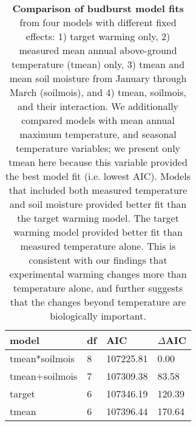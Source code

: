 \documentclass{article}
\begin{document}
\begin{table}[ht]
\centering
\caption{\textbf{Comparison of budburst model fits} from four models with different fixed effects: 1) target warming only, 2) measured mean annual above-ground temperature (tmean) only, 3) tmean and mean soil moisture from January through March (soilmois), and 4) tmean, soilmois, and their interaction. We additionally compared models with mean annual maximum temperature, and seasonal temperature variables; we present only tmean here because this variable provided the best model fit (i.e. lowest AIC). Models that included both measured temperature and soil moisture provided better fit than the target warming model. The target warming model provided better fit than measured temperature alone. This is consistent with our findings that experimental warming changes more than temperature alone, and further suggests that the changes beyond temperature are biologically important.} 
\label{table:bbaic}
\begingroup\footnotesize
\begin{tabular}{|p{}|p{}|p{}|p{}|}
  \hline
model & df & AIC & $\Delta$AIC \\ 
  \hline
tmean*soilmois & 8 & 107225.81 & 0.00 \\ 
  tmean+soilmois & 7 & 107309.38 & 83.58 \\ 
  target & 6 & 107346.19 & 120.39 \\ 
  tmean & 6 & 107396.44 & 170.64 \\ 
   \hline
\end{tabular}
\endgroup
\end{table}\clearpage
\clearpage
\end{document}
